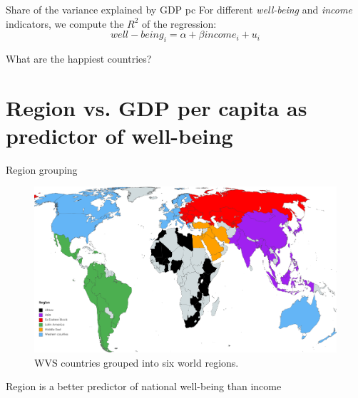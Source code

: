 \documentclass[aspectratio=169,xcolor=dvipsnames, 11pt,mathserif]{beamer}
\begin{document}
\begin{frame}{Share of the variance explained by GDP pc}
    \bbvs
    \ip For different \textit{well-being} and \textit{income} indicators, we compute the $R^2$ of the regression: $$well-being_i = \alpha + \beta income_i + u_i$$
    \ip 
    \ee
\end{frame}

\begin{frame}{What are the happiest countries?}
    \bbvs
    \ip 
    \ip 
    \ee
\end{frame}


\section{Region vs. GDP per capita as predictor of well-being}

\begin{frame}{Region grouping}
    \begin{figure}
        \caption{WVS countries grouped into six world regions.}  
        \centering \includegraphics[height=.8\textheight]{../figures/WVS_countries_regions} %
    \end{figure}
\end{frame}

\begin{frame}{Region is a better predictor of national well-being than income}
    \bbvs
    \ip 
    \ip 
    \ee
\end{frame}
\end{document}
